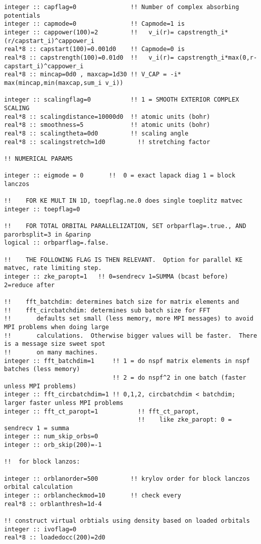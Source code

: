 \begin{verbatim}
integer :: capflag=0               !! Number of complex absorbing potentials
integer :: capmode=0               !! Capmode=1 is 
integer :: cappower(100)=2         !!   v_i(r)= capstrength_i*(r/capstart_i)^cappower_i
real*8 :: capstart(100)=0.001d0    !! Capmode=0 is    
real*8 :: capstrength(100)=0.01d0  !!   v_i(r)= capstrength_i*max(0,r-capstart_i)^cappower_i
real*8 :: mincap=0d0 , maxcap=1d30 !! V_CAP = -i* max(mincap,min(maxcap,sum_i v_i))

integer :: scalingflag=0           !! 1 = SMOOTH EXTERIOR COMPLEX SCALING
real*8 :: scalingdistance=10000d0  !! atomic units (bohr)
real*8 :: smoothness=5             !! atomic units (bohr)
real*8 :: scalingtheta=0d0         !! scaling angle
real*8 :: scalingstretch=1d0         !! stretching factor

!! NUMERICAL PARAMS

integer :: eigmode = 0       !!  0 = exact lapack diag 1 = block lanczos

!!    FOR KE MULT IN 1D, toepflag.ne.0 does single toeplitz matvec
integer :: toepflag=0

!!    FOR TOTAL ORBITAL PARALLELIZATION, SET orbparflag=.true., AND parorbsplit=3 in &parinp
logical :: orbparflag=.false.

!!    THE FOLLOWING FLAG IS THEN RELEVANT.  Option for parallel KE matvec, rate limiting step.
integer :: zke_paropt=1   !! 0=sendrecv 1=SUMMA (bcast before) 2=reduce after

!!    fft_batchdim: determines batch size for matrix elements and 
!!    fft_circbatchdim: determines sub batch size for FFT 
!!       defaults set small (less memory, more MPI messages) to avoid MPI problems when doing large 
!!       calculations.  Otherwise bigger values will be faster.  There is a message size sweet spot
!!       on many machines.
integer :: fft_batchdim=1     !! 1 = do nspf matrix elements in nspf batches (less memory)
                              !! 2 = do nspf^2 in one batch (faster unless MPI problems)
integer :: fft_circbatchdim=1 !! 0,1,2, circbatchdim < batchdim; larger faster unless MPI problems
integer :: fft_ct_paropt=1           !! fft_ct_paropt,
                                     !!    like zke_paropt: 0 = sendrecv 1 = summa
integer :: num_skip_orbs=0
integer :: orb_skip(200)=-1

!!  for block lanzos:

integer :: orblanorder=500         !! krylov order for block lanczos orbital calculation
integer :: orblancheckmod=10       !! check every
real*8 :: orblanthresh=1d-4

!! construct virtual orbtials using density based on loaded orbitals
integer :: ivoflag=0
real*8 :: loadedocc(200)=2d0
\end{verbatim}
